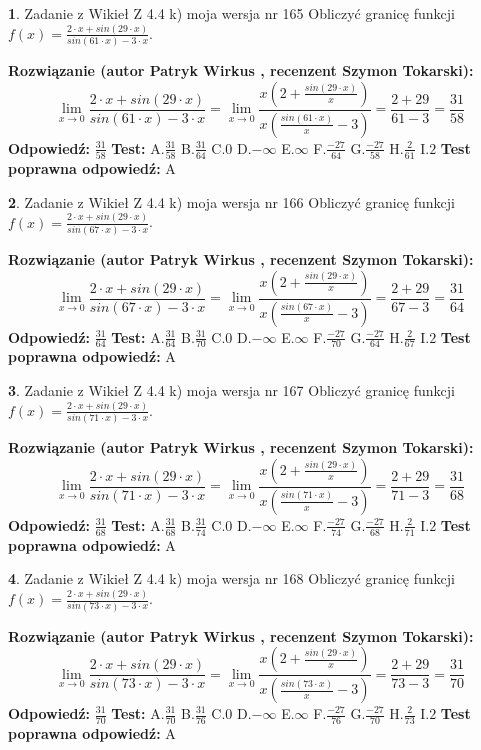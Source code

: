\documentclass[12pt, a4paper]{article}
\theoremstyle{definition} %
\newtheorem{zad}{}
\newcommand{\zadStart}[1]{\begin{zad}#1\newline}
\newcommand{\zadStop}{\end{zad}}
\newcommand{\rozwStart}[2]{\noindent \textbf{Rozwiązanie (autor #1 , recenzent #2): }\newline}
\newcommand{\rozwStop}{\newline}
\newcommand{\odpStart}{\noindent \textbf{Odpowiedź:}\newline}
\newcommand{\odpStop}{\newline}
\newcommand{\testStart}{\noindent \textbf{Test:}\newline}
\newcommand{\testStop}{\newline}
\newcommand{\kluczStart}{\noindent \textbf{Test poprawna odpowiedź:}\newline}
\newcommand{\kluczStop}{\newline}
\begin{document}
\zadStart{Zadanie z Wikieł Z 4.4 k) moja wersja nr 165}
Obliczyć granicę funkcji $f(x)=\frac{2\cdot x +sin(29\cdot x)}{sin(61\cdot x) -3\cdot x}$.
\zadStop
\rozwStart{Patryk Wirkus}{Szymon Tokarski}
$$\lim\limits_{x\to 0}\frac{2\cdot x +sin(29\cdot x)}{sin(61\cdot x) -3\cdot x}
=\lim\limits_{x\to 0}\frac{x(2+\frac{sin(29\cdot x)}{x})}{x(\frac{sin(61\cdot x)}{x}-3)}
=\frac{2+29}{61-3} = \frac{31}{58}$$
\rozwStop
\odpStart
$\frac{31}{58}$
\odpStop
\testStart
A.$\frac{31}{58}$
B.$\frac{31}{64}$
C.$0$
D.$-\infty$
E.$\infty$
F.$\frac{-27}{64}$
G.$\frac{-27}{58}$
H.$\frac{2}{61}$
I.$2$
\testStop
\kluczStart
A
\kluczStop



\zadStart{Zadanie z Wikieł Z 4.4 k) moja wersja nr 166}
Obliczyć granicę funkcji $f(x)=\frac{2\cdot x +sin(29\cdot x)}{sin(67\cdot x) -3\cdot x}$.
\zadStop
\rozwStart{Patryk Wirkus}{Szymon Tokarski}
$$\lim\limits_{x\to 0}\frac{2\cdot x +sin(29\cdot x)}{sin(67\cdot x) -3\cdot x}
=\lim\limits_{x\to 0}\frac{x(2+\frac{sin(29\cdot x)}{x})}{x(\frac{sin(67\cdot x)}{x}-3)}
=\frac{2+29}{67-3} = \frac{31}{64}$$
\rozwStop
\odpStart
$\frac{31}{64}$
\odpStop
\testStart
A.$\frac{31}{64}$
B.$\frac{31}{70}$
C.$0$
D.$-\infty$
E.$\infty$
F.$\frac{-27}{70}$
G.$\frac{-27}{64}$
H.$\frac{2}{67}$
I.$2$
\testStop
\kluczStart
A
\kluczStop



\zadStart{Zadanie z Wikieł Z 4.4 k) moja wersja nr 167}
Obliczyć granicę funkcji $f(x)=\frac{2\cdot x +sin(29\cdot x)}{sin(71\cdot x) -3\cdot x}$.
\zadStop
\rozwStart{Patryk Wirkus}{Szymon Tokarski}
$$\lim\limits_{x\to 0}\frac{2\cdot x +sin(29\cdot x)}{sin(71\cdot x) -3\cdot x}
=\lim\limits_{x\to 0}\frac{x(2+\frac{sin(29\cdot x)}{x})}{x(\frac{sin(71\cdot x)}{x}-3)}
=\frac{2+29}{71-3} = \frac{31}{68}$$
\rozwStop
\odpStart
$\frac{31}{68}$
\odpStop
\testStart
A.$\frac{31}{68}$
B.$\frac{31}{74}$
C.$0$
D.$-\infty$
E.$\infty$
F.$\frac{-27}{74}$
G.$\frac{-27}{68}$
H.$\frac{2}{71}$
I.$2$
\testStop
\kluczStart
A
\kluczStop



\zadStart{Zadanie z Wikieł Z 4.4 k) moja wersja nr 168}
Obliczyć granicę funkcji $f(x)=\frac{2\cdot x +sin(29\cdot x)}{sin(73\cdot x) -3\cdot x}$.
\zadStop
\rozwStart{Patryk Wirkus}{Szymon Tokarski}
$$\lim\limits_{x\to 0}\frac{2\cdot x +sin(29\cdot x)}{sin(73\cdot x) -3\cdot x}
=\lim\limits_{x\to 0}\frac{x(2+\frac{sin(29\cdot x)}{x})}{x(\frac{sin(73\cdot x)}{x}-3)}
=\frac{2+29}{73-3} = \frac{31}{70}$$
\rozwStop
\odpStart
$\frac{31}{70}$
\odpStop
\testStart
A.$\frac{31}{70}$
B.$\frac{31}{76}$
C.$0$
D.$-\infty$
E.$\infty$
F.$\frac{-27}{76}$
G.$\frac{-27}{70}$
H.$\frac{2}{73}$
I.$2$
\testStop
\kluczStart
A
\kluczStop
\end{document}
